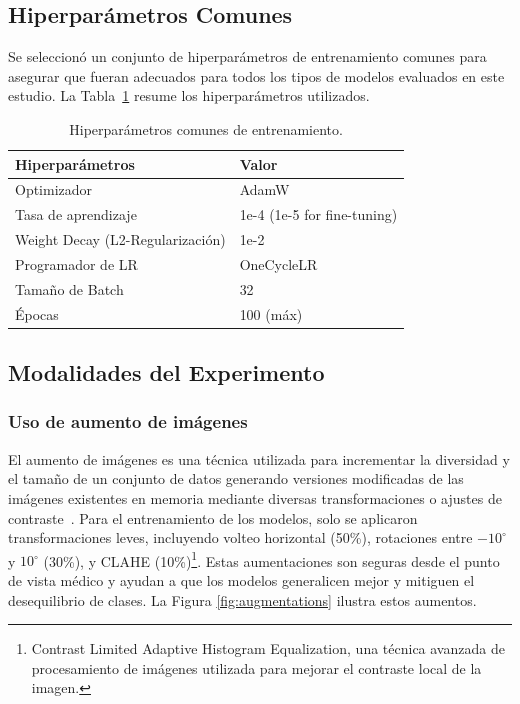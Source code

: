 \documentclass[a4paper,10pt]{book}
\begin{document}
\subsection{Hiperparámetros Comunes}

Se seleccionó un conjunto de hiperparámetros de entrenamiento comunes para asegurar que fueran adecuados para todos los tipos de modelos evaluados en este estudio. La Tabla~\ref{tab:hyperparams} resume los hiperparámetros utilizados.


\begin{table}[h!]
    \caption[Hiperparámetros comunes de entrenamiento.]{Hiperparámetros comunes de entrenamiento.}
    \centering
    \begin{tabular}{l l}
        \toprule
        \textbf{Hiperparámetros} & \textbf{Valor} \\
        \midrule
        Optimizador  & AdamW \\
        Tasa de aprendizaje  & 1e-4 (1e-5 for fine-tuning) \\
        Weight Decay (L2-Regularización) & 1e-2 \\
        Programador de LR & OneCycleLR \\
        Tamaño de Batch & 32 \\
        Épocas & 100 (máx) \\
        \bottomrule
    \end{tabular}
    \label{tab:hyperparams}
\end{table}

\subsection{Modalidades del Experimento}

\subsubsection{Uso de aumento de imágenes}

El aumento de imágenes es una técnica utilizada para incrementar la diversidad y el tamaño de un conjunto de datos generando versiones modificadas de las imágenes existentes en memoria mediante diversas transformaciones o ajustes de contraste~\cite{noauthor_complete_nodate}. Para el entrenamiento de los modelos, solo se aplicaron transformaciones leves, incluyendo volteo horizontal (50\%), rotaciones entre $-10^\circ$ y $10^\circ$ (30\%), y CLAHE (10\%)\footnote{Contrast Limited Adaptive Histogram Equalization, una técnica avanzada de procesamiento de imágenes utilizada para mejorar el contraste local de la imagen.}. Estas aumentaciones son seguras desde el punto de vista médico y ayudan a que los modelos generalicen mejor y mitiguen el desequilibrio de clases. La Figura \ref{fig:augmentations} ilustra estos aumentos.
\end{document}
